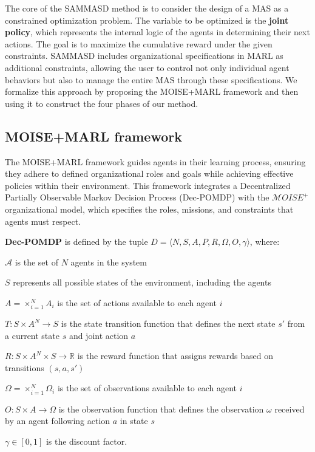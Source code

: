 \documentclass[conference]{IEEEtran}
\begin{document}
The core of the SAMMASD method is to consider the design of a MAS as a constrained optimization problem. The variable to be optimized is the \textbf{joint policy}, which represents the internal logic of the agents in determining their next actions. The goal is to maximize the cumulative reward under the given constraints. SAMMASD includes organizational specifications in MARL as additional constraints, allowing the user to control not only individual agent behaviors but also to manage the entire MAS through these specifications. We formalize this approach by proposing the MOISE+MARL framework and then using it to construct the four phases of our method.

\subsection{\textbf{MOISE+MARL framework}}

The MOISE+MARL framework guides agents in their learning process, ensuring they adhere to defined organizational roles and goals while achieving effective policies within their environment. This framework integrates a Decentralized Partially Observable Markov Decision Process (Dec-POMDP) with the $\mathcal{M}OISE^+$ organizational model, which specifies the roles, missions, and constraints that agents must respect.

\textbf{Dec-POMDP} \quad is defined by the tuple $D = \langle N, S, A, P, R, \Omega, O, \gamma \rangle$, where:
%
\begin{itemize*}[label={},itemjoin={; }]
    \item $\mathcal{A}$ is the set of $N$ agents in the system
    \item $S$ represents all possible states of the environment, including the agents
    \item $A = \times_{i=1}^N A_i$ is the set of actions available to each agent $i$
    \item $T: S \times A^N \to S$ is the state transition function that defines the next state $s'$ from a current state $s$ and joint action $a$
    \item $R: S \times A^N \times S \to \mathbb{R}$ is the reward function that assigns rewards based on transitions $(s, a, s')$
    \item $\Omega = \times_{i=1}^N \Omega_i$ is the set of observations available to each agent $i$
    \item $O: S \times A \to \Omega$ is the observation function that defines the observation $\omega$ received by an agent following action $a$ in state $s$
    \item $\gamma \in [0, 1]$ is the discount factor.
\end{itemize*}
\end{document}
